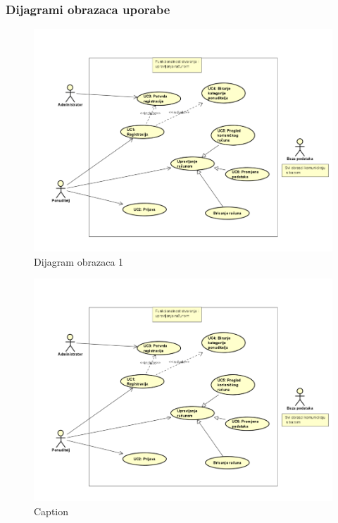 				\subsubsection{Dijagrami obrazaca uporabe}
					
				\begin{figure}
    					\centering
    					\includegraphics[width = \textwidth]{slike/DO1}
    					\caption{Dijagram obrazaca 1}
    					\label{fig:Dijagram obrazaca 1}
				\end{figure}

\begin{figure}
    \centering
    \includegraphics[width = \textwidth]{slike/DO1.png}
    \caption{Caption}
    \label{fig:enter-label}
\end{figure}

